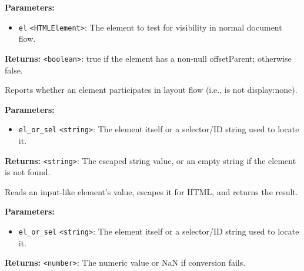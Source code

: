 \documentclass[12pt,a4paper]{article}
\begin{document}
\vspace{5mm}
\noindent {}


\noindent \textbf{Parameters:}
\begin{itemize}
  \item \texttt{el} \texttt{<HTMLElement>}: The element to test for visibility in normal document flow.
\end{itemize}

\noindent \textbf{Returns:} \texttt{<boolean>}: \textasciigrave{}true\textasciigrave{} if the element has a non-null \textasciigrave{}offsetParent\textasciigrave{}; otherwise \textasciigrave{}false\textasciigrave{}.

\noindent Reports whether an element participates in layout flow (i.e., is not \textasciigrave{}display:none\textasciigrave{}).

\vspace{5mm}
\noindent {}


\noindent \textbf{Parameters:}
\begin{itemize}
  \item \texttt{el\_or\_sel} \texttt{<string>}: The element itself or a selector/ID string used to locate it.
\end{itemize}

\noindent \textbf{Returns:} \texttt{<string>}: The escaped string value, or an empty string if the element is not found.

\noindent Reads an input-like element’s value, escapes it for HTML, and returns the result.

\vspace{5mm}
\noindent {}


\noindent \textbf{Parameters:}
\begin{itemize}
  \item \texttt{el\_or\_sel} \texttt{<string>}: The element itself or a selector/ID string used to locate it.
\end{itemize}

\noindent \textbf{Returns:} \texttt{<number>}: The numeric value or \textasciigrave{}NaN\textasciigrave{} if conversion fails.
\end{document}
